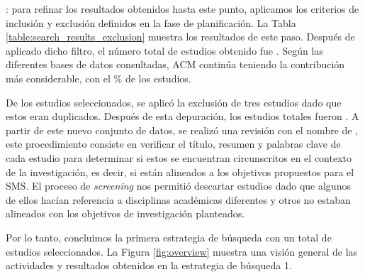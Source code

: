 : para refinar los resultados obtenidos hasta este punto, aplicamos los criterios de inclusión y exclusión definidos en la fase de planificación. La Tabla \ref{table:search_results_exclusion} muestra los resultados de este paso. Después de aplicado dicho filtro, el número total de estudios obtenido fue \itot. Según las diferentes bases de datos consultadas, ACM continúa teniendo la contribución más considerable, con el \iacmp\% de los estudios.





De los \itot{} estudios seleccionados, se aplicó la exclusión de tres estudios dado que estos eran duplicados. Después de esta depuración, los estudios totales fueron \depTot{}. A partir de este nuevo conjunto de datos, se realizó una revisión con el nombre de  , este procedimiento consiste en verificar el título, resumen y palabras clave de cada estudio para determinar si estos se encuentran circunscritos en el contexto de la investigación, es decir, si están alineados a los objetivos propuestos para el SMS. El proceso de \textit{screening} nos permitió descartar \screen{} estudios dado que algunos de ellos hacían referencia a disciplinas académicas diferentes y otros no estaban alineados con los objetivos de investigación planteados.

Por lo tanto, concluimos la primera estrategia de búsqueda con un total de \screenTot{} estudios seleccionados. La Figura \ref{fig:overview} muestra una visión general de las actividades y resultados obtenidos en la estrategia de búsqueda 1.

